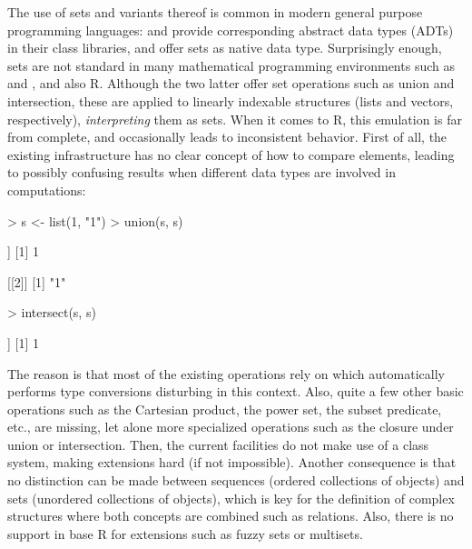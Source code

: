 \documentclass[article]{jss}
\newcommand\R{\textsf{R}}
\newcommand{\codefun}[1]{\code{#1()}}
\begin{document}
The use of sets and variants thereof is common in modern general purpose
programming languages:   and 
provide corresponding abstract data types (ADTs) in their class
libraries,  and 
offer sets as native data type.
Surprisingly enough, sets are not standard in many
mathematical programming environments such as  and
, and also \R. Although the two latter offer
set operations such as union and intersection, these are applied to
linearly indexable structures (lists and vectors, respectively),
\emph{interpreting} them as sets. When it comes to \R,
this emulation is far from complete, and occasionally leads to inconsistent
behavior. First of all, the existing infrastructure has no clear concept
of how to compare elements, leading to possibly confusing
results when different data types are involved in
computations:
\begin{Schunk}
\begin{Sinput}
> s <- list(1, "1")
> union(s, s)
\end{Sinput}
\begin{Soutput}
[[1]]
[1] 1

[[2]]
[1] "1"
\end{Soutput}
\begin{Sinput}
> intersect(s, s)
\end{Sinput}
\begin{Soutput}
[[1]]
[1] 1
\end{Soutput}
\end{Schunk}
The reason is that most of the existing operations rely on
\codefun{match} which automatically performs type conversions
disturbing in this context.
Also, quite a few other basic operations such as
the Cartesian product, the power set, the subset predicate, etc., are
missing, let alone more specialized operations such as
the closure under union or intersection.
Then, the current facilities do not make use of a class
system, making extensions hard (if not impossible).  Another consequence
is that no distinction can be made between sequences (ordered
collections of objects) and sets (unordered collections of objects),
which is key for the definition of complex structures
where both concepts are combined such as relations.
Also, there is no support in base \R{} for extensions such as fuzzy sets
or multisets.
\end{document}
